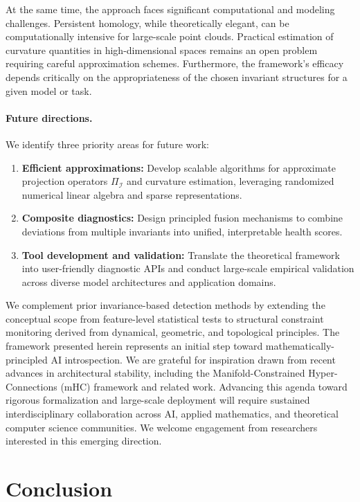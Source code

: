 \documentclass[11pt]{article}
\begin{document}
At the same time, the approach faces significant computational and modeling challenges. Persistent homology, while theoretically elegant, can be computationally intensive for large-scale point clouds. Practical estimation of curvature quantities in high-dimensional spaces remains an open problem requiring careful approximation schemes. Furthermore, the framework's efficacy depends critically on the appropriateness of the chosen invariant structures for a given model or task.

\paragraph{Future directions.}
We identify three priority areas for future work:
\begin{enumerate}
\item \textbf{Efficient approximations:} Develop scalable algorithms for approximate projection operators $\Pi_{\mathcal{I}}$ and curvature estimation, leveraging randomized numerical linear algebra and sparse representations.
\item \textbf{Composite diagnostics:} Design principled fusion mechanisms to combine deviations from multiple invariants into unified, interpretable health scores.
\item \textbf{Tool development and validation:} Translate the theoretical framework into user-friendly diagnostic APIs and conduct large-scale empirical validation across diverse model architectures and application domains.
\end{enumerate}

We complement prior invariance-based detection methods by extending the conceptual scope from feature-level statistical tests to structural constraint monitoring derived from dynamical, geometric, and topological principles. The framework presented herein represents an initial step toward mathematically-principled AI introspection. We are grateful for inspiration drawn from recent advances in architectural stability, including the Manifold-Constrained Hyper-Connections (mHC) framework \cite{deepseek2025mhc} and related work. Advancing this agenda toward rigorous formalization and large-scale deployment will require sustained interdisciplinary collaboration across AI, applied mathematics, and theoretical computer science communities. We welcome engagement from researchers interested in this emerging direction.

\section{Conclusion}
\end{document}
